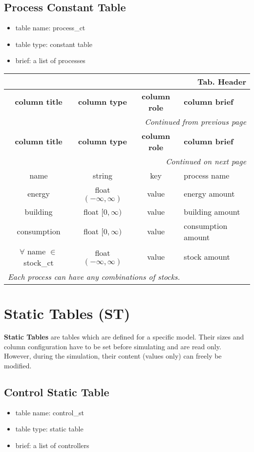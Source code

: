 \documentclass[a4paper,oneside,titlepage]{report}
\newcommand*{\LTHeaderIV}[5]{
  \multicolumn{4}{r}{\textbf{Tab. \thesubsection} \textbf{#1}}\\    
  \hline
  \textbf{#2} & \textbf{#3} & \textbf{#4} & \textbf{#5}\\
  \hline
  
  \endfirsthead
  \multicolumn{4}{r}{\textit{Continued from previous page}}\\    
  \hline
  \textbf{#2} & \textbf{#3} & \textbf{#4} & \textbf{#5}\\
  \hline
  \endhead
  \hline
  \multicolumn{4}{r}{\textit{Continued on next page}}\\
  \endfoot
  \hline
  \endlastfoot  
}
\begin{document}
\subsection{Process Constant Table}
\begin{itemize}
  \setlength{\itemsep}{0pt}
  \setlength{\parskip}{0pt}
\item table name: process\_ct  
\item table type: constant table   
\item brief: a list of processes
\end{itemize}

\vspace{-0.5cm}
\begin{longtable}{ |c|c|c|l| } 
  \LTHeaderIV{Header}{column title}{column type}{column role}{column brief}                    
  name & string & key & process name\\
  energy & float $(-\infty, \infty)$ & value & energy amount \\
  building & float $[0, \infty)$ & value & building  amount \\
  consumption & float $[0, \infty)$ & value & consumption amount \\
  $\forall$ name $\in$ stock\_ct & float $(-\infty, \infty)$ & value & stock amount\\
  \multicolumn{4}{|l|}{\textit{Each process can have any combinations of stocks.}}\\
\end{longtable}        

\section{Static Tables (ST)}
\textbf{Static Tables} are tables which are defined for a specific model. Their sizes and column configuration have to be set before simulating and are read only. However, during the simulation, their content (values only) can freely be modified.

\subsection{Control Static Table}
\begin{itemize}
  \setlength{\itemsep}{0pt}
  \setlength{\parskip}{0pt}
\item table name: control\_st  
\item table type: static table   
\item brief: a list of controllers
\end{itemize}
\end{document}

